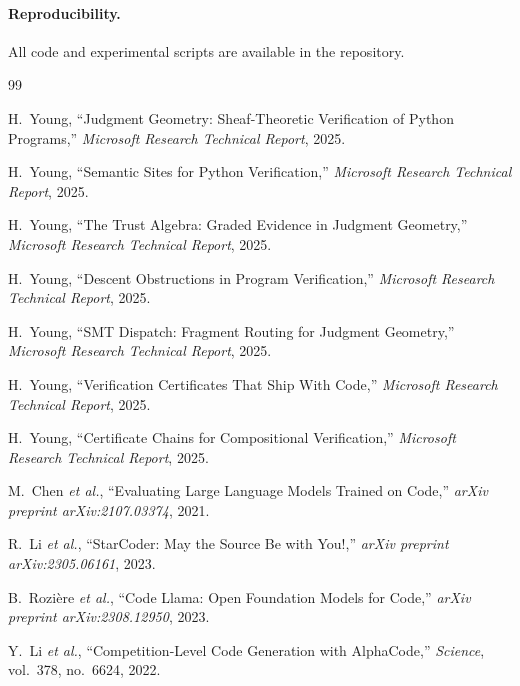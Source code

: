 \documentclass[11pt]{article}
\begin{document}
\paragraph{Reproducibility.}
All code and experimental scripts are available in the
\JuGeo{} repository.


\begin{thebibliography}{99}

H.~Young,
``Judgment Geometry: Sheaf-Theoretic Verification of Python Programs,''
\emph{Microsoft Research Technical Report}, 2025.

H.~Young,
``Semantic Sites for Python Verification,''
\emph{Microsoft Research Technical Report}, 2025.

H.~Young,
``The Trust Algebra: Graded Evidence in Judgment Geometry,''
\emph{Microsoft Research Technical Report}, 2025.

H.~Young,
``Descent Obstructions in Program Verification,''
\emph{Microsoft Research Technical Report}, 2025.

H.~Young,
``SMT Dispatch: Fragment Routing for Judgment Geometry,''
\emph{Microsoft Research Technical Report}, 2025.

H.~Young,
``Verification Certificates That Ship With Code,''
\emph{Microsoft Research Technical Report}, 2025.

H.~Young,
``Certificate Chains for Compositional Verification,''
\emph{Microsoft Research Technical Report}, 2025.

M.~Chen \emph{et al.},
``Evaluating Large Language Models Trained on Code,''
\emph{arXiv preprint arXiv:2107.03374}, 2021.

R.~Li \emph{et al.},
``StarCoder: May the Source Be with You!,''
\emph{arXiv preprint arXiv:2305.06161}, 2023.

B.~Rozi\`{e}re \emph{et al.},
``Code Llama: Open Foundation Models for Code,''
\emph{arXiv preprint arXiv:2308.12950}, 2023.

Y.~Li \emph{et al.},
``Competition-Level Code Generation with AlphaCode,''
\emph{Science}, vol.~378, no.~6624, 2022.


\end{thebibliography}
\end{document}
